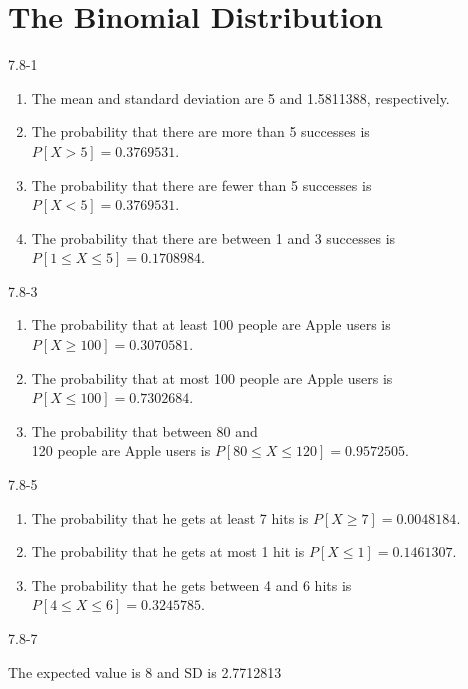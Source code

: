 \setcounter{chapter}{7}\chapter{The Binomial Distribution}
\begin{exsol@solution}{7.8-1}

		\begin{enumerate}
	  \item The mean and standard deviation are 5 and 1.5811388, respectively.
    \item The probability that there are more than 5 successes is $P[ X > 5 ] = 0.3769531$.
    \item The probability that there are fewer than 5 successes is $P[ X < 5 ] = 0.3769531$.
    \item The probability that there  are between 1 and 3 successes  is $P[ 1 \le X \le 5 ] = 0.1708984$.
	  \end{enumerate}
\end{exsol@solution}
\begin{exsol@solution}{7.8-3}

\begin{enumerate}
\item The probability that at least 100 people are Apple users is $P[X \ge 100] = 0.3070581$.
\item The probability that at most 100 people are Apple users is $P[X \le 100] = 0.7302684$.
\item The probability that between 80 and \\ 120 people are Apple users is $P[ 80 \le X \le 120] = 0.9572505$.
\end{enumerate}
\end{exsol@solution}
\begin{exsol@solution}{7.8-5}

\begin{enumerate}
\item The probability that he gets at least 7 hits is $P[X \ge 7] = 0.0048184$.
\item The probability that he gets at most 1 hit is $P[X \le 1] = 0.1461307$.
\item The probability that he gets between 4 and 6 hits is $P[4 \le X \le 6] = 0.3245785$.
\end{enumerate}

\end{exsol@solution}
\begin{exsol@solution}{7.8-7}

The expected value is 8 and SD is 2.7712813
\end{exsol@solution}

